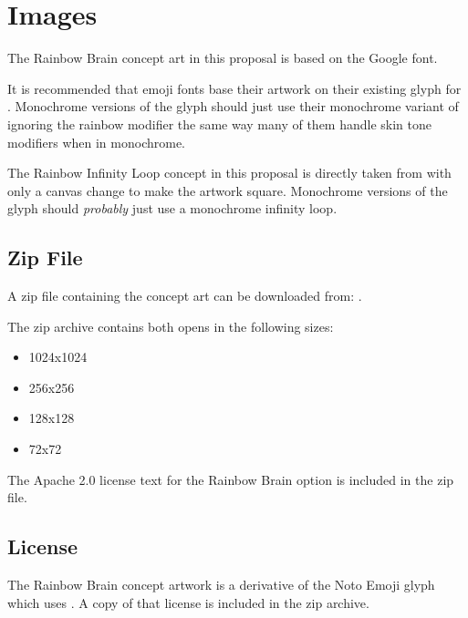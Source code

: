 \section{Images}

The Rainbow Brain concept art in this proposal is based on the Google\textsuperscript{\textregistered}
 font.

It is recommended that emoji fonts base their artwork on their existing glyph for
\brainemoji{}. Monochrome versions of the glyph should just use their
monochrome variant of \brainemoji{} ignoring the rainbow modifier the
same way many of them handle skin tone modifiers when in monochrome.

The Rainbow Infinity Loop concept in this proposal is directly taken from
with only a canvas change to make the artwork square. Monochrome versions of the glyph
should \emph{probably} just use a monochrome infinity loop.

\subsection{Zip File}
A zip file containing the concept art can be downloaded from:
.

The zip archive contains both opens in the following sizes:

\begin{itemize}
\item 1024x1024
\item 256x256
\item 128x128
\item 72x72
\end{itemize}

The Apache 2.0 license text for the Rainbow Brain option is included in the zip file.

\subsection{License}

The Rainbow Brain concept artwork is a derivative of the Noto Emoji \brainemoji{} glyph
which uses .
A copy of that license is included in the zip archive.

